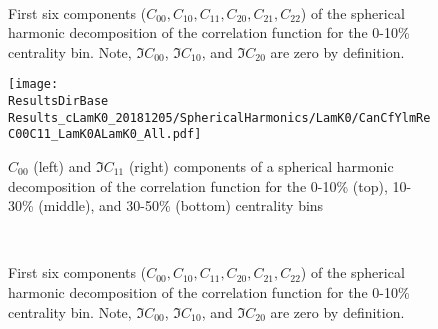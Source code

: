 \documentclass[/home/jesse/Analysis/FemtoAnalysis/AnalysisNotes/AnalysisNoteJBuxton.tex]{subfiles}
\begin{document}
\begin{figure}[h!]
  \centering
   \\
  \caption[\LamKchM First Six Components of Spherical Harmonic Decomposition (0-10\%)]{First six components ($C_{00}, C_{10}, C_{11}, C_{20}, C_{21}, C_{22}$) of the spherical harmonic decomposition of the \LamKchM correlation function for the 0-10\% centrality bin.
  Note, $\Im C_{00}$, $\Im C_{10}$, and $\Im C_{20}$ are zero by definition.}
  \label{fig:LamKchM_FirstSixCYlm}
\end{figure}













\begin{figure}[h]
  \centering
  \texttt{[image: \\ResultsDirBase Results\_cLamK0\_20181205/SphericalHarmonics/LamK0/CanCfYlmReC00C11\_LamK0ALamK0\_All.pdf]}
  \caption[\LamKs $C_{00}$ and $\Im C_{11}$ Spherical Harmonic Components]{$C_{00}$ (left) and $\Im C_{11}$ (right) components of a spherical harmonic decomposition of the \LamKs correlation function for the 0-10\% (top), 10-30\% (middle), and 30-50\% (bottom) centrality bins}
  \label{fig:LamK0_ReC00C11_All}
\end{figure}



\begin{figure}[h!]
  \centering
   \\
  \caption[\LamKs First Six Components of Spherical Harmonic Decomposition (0-10\%)]{First six components ($C_{00}, C_{10}, C_{11}, C_{20}, C_{21}, C_{22}$) of the spherical harmonic decomposition of the \LamKs correlation function for the 0-10\% centrality bin.
  Note, $\Im C_{00}$, $\Im C_{10}$, and $\Im C_{20}$ are zero by definition.}
  \label{fig:LamK0_FirstSixCYlm}
\end{figure}

\clearpage
\end{document}
